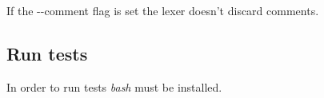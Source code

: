 \documentclass[a4paper,12pt]{article}
\begin{document}
If the -{}-comment flag is set the lexer doesn't discard comments.

\subsection{Run tests}

In order to run tests \emph{bash} must be installed.

\appendix
\end{document}
